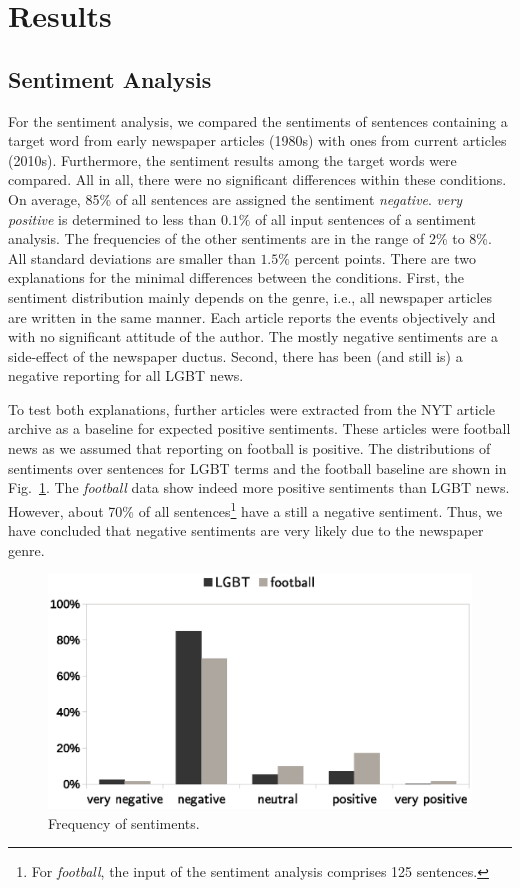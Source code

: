 \documentclass[10pt,a4paper,twocolumn]{scrartcl}
\begin{document}
\section{Results}

\subsection{Sentiment Analysis}

For the sentiment analysis, we compared the sentiments of sentences containing a target word from early newspaper articles (1980s) with ones from current articles (2010s). Furthermore, the sentiment results among the target words were compared. All in all, there were no significant differences within these conditions. On average, 85\% of all sentences are assigned the sentiment \textit{negative}. \textit{very positive} is determined to less than $0.1\%$ of all input sentences of a sentiment analysis. The frequencies of the other sentiments are in the range of 2\% to 8\%. All standard deviations are smaller than $1.5\%$ percent points. There are two explanations for the minimal differences between the conditions. First, the sentiment distribution mainly depends on the genre, i.e., all newspaper articles are written in the same manner. Each article reports the events objectively and with no significant attitude of the author. The mostly negative sentiments are a side-effect of the newspaper ductus. Second, there has been (and still is) a negative reporting for all LGBT news.

To test both explanations, further articles were extracted from the NYT article archive as a baseline for expected positive sentiments. These articles were football news as we assumed that reporting on football is positive. The distributions of sentiments over sentences for LGBT terms and the football baseline are shown in Fig.~\ref{fig:sentiment1}. The \textit{football} data show indeed more positive sentiments than LGBT news. However, about 70\% of all sentences\footnote{For \textit{football}, the input of the sentiment analysis comprises 125 sentences.} have a still a negative sentiment. Thus, we have concluded that negative sentiments are very likely due to the newspaper genre.

\begin{figure}
\includegraphics[width=\columnwidth]{figures/sentiment1}
\caption{Frequency of sentiments.}\label{fig:sentiment1}
\end{figure} 
\end{document}
